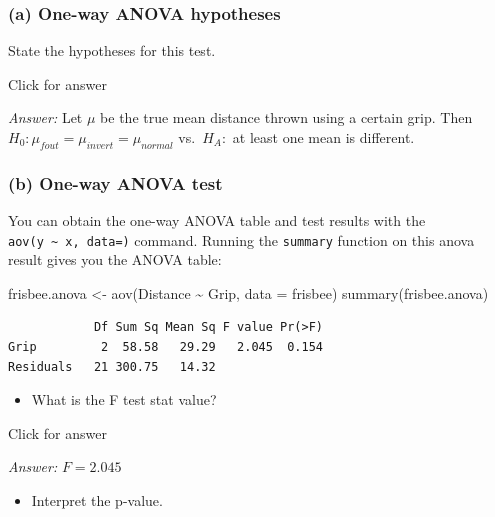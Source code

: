 \documentclass[
]{book}
\newenvironment{Shaded}{\begin{snugshade}}{\end{snugshade}}
\newcommand{\AttributeTok}[1]{\textcolor[rgb]{0.77,0.63,0.00}{#1}}
\newcommand{\FunctionTok}[1]{\textcolor[rgb]{0.00,0.00,0.00}{#1}}
\newcommand{\NormalTok}[1]{#1}
\newcommand{\OtherTok}[1]{\textcolor[rgb]{0.56,0.35,0.01}{#1}}
\newcommand{\SpecialCharTok}[1]{\textcolor[rgb]{0.00,0.00,0.00}{#1}}
\providecommand{\tightlist}{%
  \setlength{\itemsep}{0pt}\setlength{\parskip}{0pt}}
\begin{document}
\hypertarget{a-one-way-anova-hypotheses}{%
\subsubsection{(a) One-way ANOVA hypotheses}\label{a-one-way-anova-hypotheses}}

State the hypotheses for this test.

Click for answer

\emph{Answer:} Let \(\mu\) be the true mean distance thrown using a certain grip. Then
\(H_0: \mu_{fout} = \mu_{invert} = \mu_{normal}\)
vs.~\(H_A:\) at least one mean is different.

\hypertarget{b-one-way-anova-test}{%
\subsubsection{(b) One-way ANOVA test}\label{b-one-way-anova-test}}

You can obtain the one-way ANOVA table and test results with the \texttt{aov(y\ \textasciitilde{}\ x,\ data=)} command. Running the \texttt{summary} function on this anova result gives you the ANOVA table:

\begin{Shaded}
\begin{Highlighting}[]
\NormalTok{frisbee.anova }\OtherTok{\textless{}{-}} \FunctionTok{aov}\NormalTok{(Distance }\SpecialCharTok{\textasciitilde{}}\NormalTok{ Grip, }\AttributeTok{data =}\NormalTok{ frisbee)}
\FunctionTok{summary}\NormalTok{(frisbee.anova)}
\end{Highlighting}
\end{Shaded}

\begin{verbatim}
            Df Sum Sq Mean Sq F value Pr(>F)
Grip         2  58.58   29.29   2.045  0.154
Residuals   21 300.75   14.32               
\end{verbatim}

\begin{itemize}
\tightlist
\item
  What is the F test stat value?
\end{itemize}

Click for answer

\emph{Answer:} \(F = 2.045\)

\begin{itemize}
\tightlist
\item
  Interpret the p-value.
\end{itemize}
\end{document}
